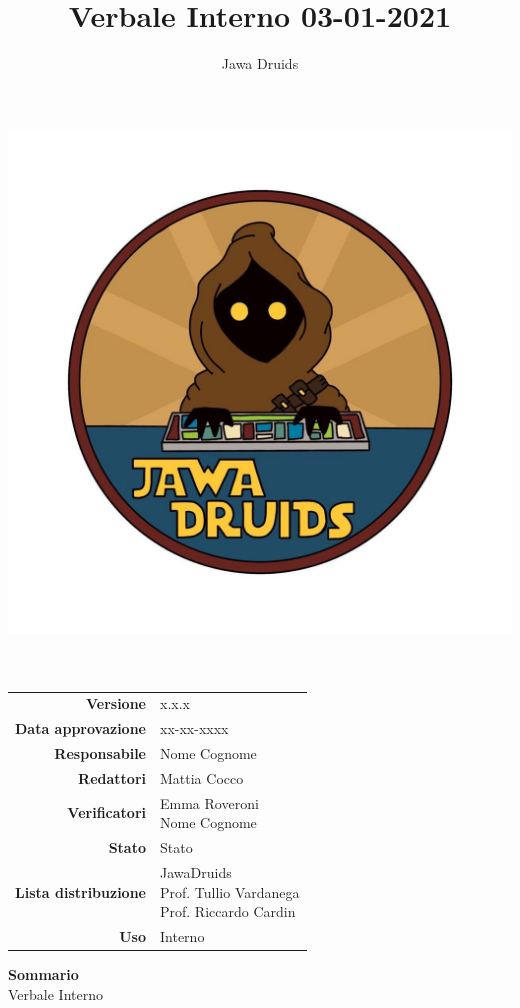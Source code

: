 



	\makeatletter
	\begin{titlepage}
		\begin{center}
			\vspace*{-5cm}
			\author{Jawa Druids} 
			\title{Verbale Interno 03-01-2021}
			\date{} %
			\includegraphics[width=0.7\linewidth]{../../immagini/DRUIDSLOGO.jpg}\\[4ex]
			{\huge \bfseries  \@title }\\[2ex] 
			{\LARGE  \@author}\\[50ex]
			\vspace*{-9cm}
			\begin{table}[H]
				\renewcommand{\arraystretch}{1.4}
				\centering
				\begin{tabular}{r | l}
					\textbf{Versione} & x.x.x \\%
					\textbf{Data approvazione} & xx-xx-xxxx\\
					\textbf{Responsabile} & Nome Cognome\\
					\textbf{Redattori} & Mattia Cocco \\
					\textbf{Verificatori} & \makecell[tl]{Emma Roveroni \\ Nome Cognome} \\
					\textbf{Stato} & Stato\\
					\textbf{Lista distribuzione} & \makecell[tl]{ JawaDruids \\ Prof. Tullio Vardanega \\ Prof. Riccardo Cardin }\\
					\textbf{Uso} & Interno            
				\end{tabular}
			\end{table}
			\vspace{0.1cm}
			\hfill \break
			\fontsize{17}{10}\textbf{Sommario} \\
			\vspace{0.1cm}
			Verbale Interno
		\end{center}
	\end{titlepage}
	\makeatother
	
	\newpage
	\tableofcontents{}
	
